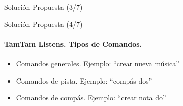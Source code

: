 \begin{frame}{Soluci\'on Propuesta (3/7)}

\end{frame}


\begin{frame}{Soluci\'on Propuesta (4/7)}
\framesubtitle{TamTam Listens. Tipos de Comandos.}
\begin{itemize}
    \item<+->Comandos generales. Ejemplo: ``crear nueva m\'usica''
    \item<+->Comandos de pista. Ejemplo: ``comp\'as dos''
    \item<+->Comandos de comp\'as. Ejemplo: ``crear nota do''
\end{itemize}
\end{frame}

